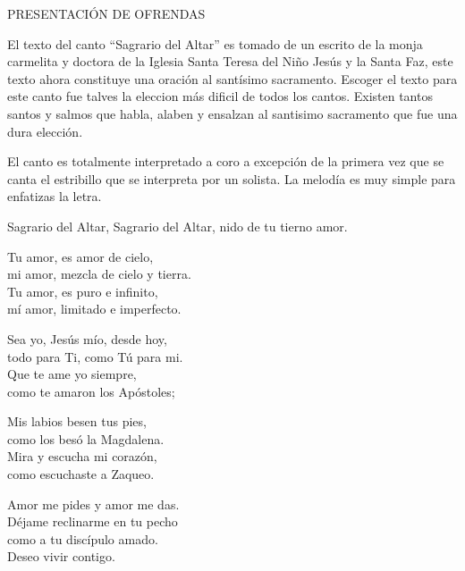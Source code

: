 \documentclass[12pt, letterpaper]{report}
\begin{document}


    \begin{center}
      {\large PRESENTACI\'ON DE OFRENDAS}
    \end{center}

    El texto del canto ``Sagrario del Altar'' es tomado de un escrito de la monja carmelita y doctora de la Iglesia Santa Teresa del Ni\~no Jes\'us y la Santa Faz, este texto ahora constituye una oraci\'on al sant\'isimo sacramento. Escoger el texto para este canto fue talves la eleccion m\'as dificil de todos los cantos. Existen tantos santos y salmos que habla, alaben y ensalzan al santisimo sacramento que fue una dura elecci\'on.

    El canto es totalmente interpretado a coro a excepci\'on de la primera vez que se canta el estribillo que se interpreta por un solista. La melod\'ia es muy simple para enfatizas la letra.

    \noindent
    Sagrario del Altar, Sagrario del Altar, nido de tu tierno amor.

    \noindent
    Tu amor, es amor de cielo,\\
    mi amor, mezcla de cielo y tierra.\\
    Tu amor, es puro e infinito,\\
    m\'i amor, limitado e imperfecto.

    \noindent
    Sea yo, Jes\'us m\'io, desde hoy,\\
    todo para Ti, como T\'u para mi.\\
    Que te ame yo siempre,\\
    como te amaron los Ap\'ostoles;

    \noindent
    Mis labios besen tus pies,\\
    como los bes\'o la Magdalena.\\
    Mira y escucha mi coraz\'on,\\
    como escuchaste a Zaqueo.

    \noindent
    Amor me pides y amor me das.\\
    D\'ejame reclinarme en tu pecho\\
    como a tu disc\'ipulo amado.\\
    Deseo vivir contigo.
\end{document}
